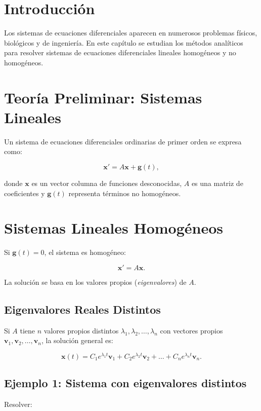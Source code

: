 
\section{Introducción}
Los sistemas de ecuaciones diferenciales aparecen en numerosos problemas físicos, biológicos y de ingeniería. En este capítulo se estudian los métodos analíticos para resolver sistemas de ecuaciones diferenciales lineales homogéneos y no homogéneos.

\section{Teoría Preliminar: Sistemas Lineales}
Un sistema de ecuaciones diferenciales ordinarias de primer orden se expresa como:

\begin{equation}
\mathbf{x'} = A\mathbf{x} + \mathbf{g}(t),
\end{equation}

donde \( \mathbf{x} \) es un vector columna de funciones desconocidas, \( A \) es una matriz de coeficientes y \( \mathbf{g}(t) \) representa términos no homogéneos.

\section{Sistemas Lineales Homogéneos}
Si \( \mathbf{g}(t) = 0 \), el sistema es homogéneo:

\begin{equation}
\mathbf{x'} = A\mathbf{x}.
\end{equation}

La solución se basa en los valores propios (\textit{eigenvalores}) de \( A \).

\subsection{Eigenvalores Reales Distintos}
Si \( A \) tiene \( n \) valores propios distintos \( \lambda_1, \lambda_2, \dots, \lambda_n \) con vectores propios \( \mathbf{v}_1, \mathbf{v}_2, \dots, \mathbf{v}_n \), la solución general es:

\begin{equation}
\mathbf{x}(t) = C_1 e^{\lambda_1 t} \mathbf{v}_1 + C_2 e^{\lambda_2 t} \mathbf{v}_2 + \dots + C_n e^{\lambda_n t} \mathbf{v}_n.
\end{equation}

\subsection*{Ejemplo 1: Sistema con eigenvalores distintos}
Resolver:

